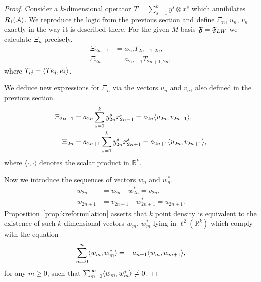   \begin{proof}
    Consider a $k$-dimensional operator $T = \sum_{s=1}^k y^s \otimes x^s$ which annihilates $R_1(\cal{A})$.
    We reproduce the logic from the previous section and define $\Xi_n$, $u_n$, $v_n$ exactly in the way it is described there.
    For the given $M$-basis $\fsys = \fsys_{LW}$ we calculate $\Xi_n$ precisely.
    \begin{align*}
      \Xi_{2n-1} &= a_{2n}T_{2n - 1, 2n},\\
      \Xi_{2n} &= a_{2n + 1}T_{2n + 1, 2n},
    \end{align*}
      where $T_{ij} = \inner{Te_j}{e_i}$.

    We deduce new expressions for $\Xi_n$ via the vectors $u_n$ and $v_n$,
      also defined in the previous section.
    \begin{equation}
      \begin{aligned}
        \Xi_{2n-1} &= a_{2n} \sum_{s=1}^k y^s_{2n} x^s_{2n-1} = a_{2n} \inner{u_{2n}}{v_{2n-1}},\\
        \Xi_{2n} &= a_{2n+1} \sum_{s=1}^k y^s_{2n} x^s_{2n+1} = a_{2n+1} \inner{u_{2n}}{v_{2n+1}},
      \end{aligned}
    \end{equation}
      where $\langle\cdot, \cdot\rangle$ denotes the scalar product in $\mathbb{R}^k$.

    Now we introduce the sequences of vectors $w_n$ and $w^*_n$.
    \begin{align*}
      w_{2n} &= u_{2n} \quad w^*_{2n} = v_{2n},\\
      w_{2n+1} &= v_{2n+1} \quad w^*_{2n+1} = u_{2n+1}.
    \end{align*}
    Proposition~\ref{prop:kreformulation} asserts that $k$ point density is equivalent to the existence of
      such $k$-dimensional vectors $w_m$, $w^*_m$ lying in $\ell^2(\mathbb{R}^k)$ which comply with the equation
    \begin{equation}
      \label{eq:vector2}
      \sum_{m=0}^n \inner{w_m}{w^*_m} = -a_{n+1} \inner{w_m}{w_{m+1}},
    \end{equation}
      for any $m \geq 0$, such that $\sum_{m=0}^\infty \inner{w_m}{w^*_m} \neq 0$.


\end{proof}
